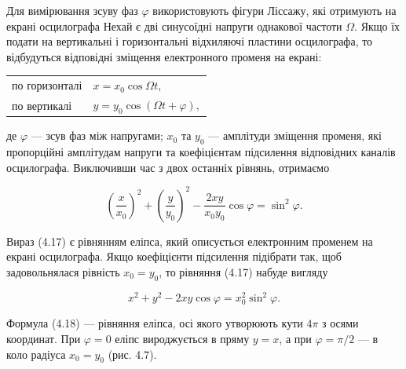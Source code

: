 \documentclass[12pt, a4paper]{article}
\begin{document}
    Для вимірювання зсуву фаз $\varphi$ використовують фігури Ліссажу,
    які отримують на екрані осцилографа
    Нехай є дві синусоїдні напруги однакової частоти $\Omega$.
    Якщо їх подати на вертикальні і горизонтальні відхиляючі
    пластини осцилографа, то
    відбудуться відповідні зміщення електронного променя на екрані:

    \vspace{0.5em}

    \begin{center}
        \begin{tabular}{ll}
            по горизонталі & \( x = x_0 \cos \Omega t, \) \\
            по вертикалі   & \( y = y_0 \cos(\Omega t + \varphi), \)
        \end{tabular}
    \end{center}

    де $\varphi$ --- зсув фаз між напругами; $x_0$ та $y_0$ --- амплітуди зміщення променя,
    які пропорційні амплітудам напруги та коефіцієнтам
    підсилення відповідних каналів осцилографа.
    Виключивши час з двох останніх рівнянь, отримаємо

    \vspace{0.5em}

    \begin{equation}
        \left( \frac{x}{x_0} \right)^2 + \left( \frac{y}{y_0} \right)^2 - \frac{2xy}{x_0 y_0} \cos \varphi = \sin^2 \varphi.
        \tag{4.17}
    \end{equation}

    \vspace{0.5em}

    Вираз (4.17) є рівнянням еліпса, який описується електронним
    променем на екрані осцилографа.
    Якщо коефіцієнти підсилення підібрати так,
    щоб задовольнялася рівність $x_0 = y_0$, то рівняння (4.17)
    набуде вигляду

    \vspace{0.5em}

    \begin{equation}
        x^2 + y^2 -2xy \cos \varphi = x_0^2 \sin^2 \varphi.
        \tag{4.18}
    \end{equation}

    \vspace{0.5em}

    Формула (4.18) --- рівняння еліпса, осі якого утворюють кути
    $4\pi$ з осями координат.
    При $\varphi = 0$ еліпс вироджується в пряму $y = x$,
    а при $\varphi = \pi / 2$ --- в коло радіуса $x_0 = y_0$ (рис. 4.7).
\end{document}
